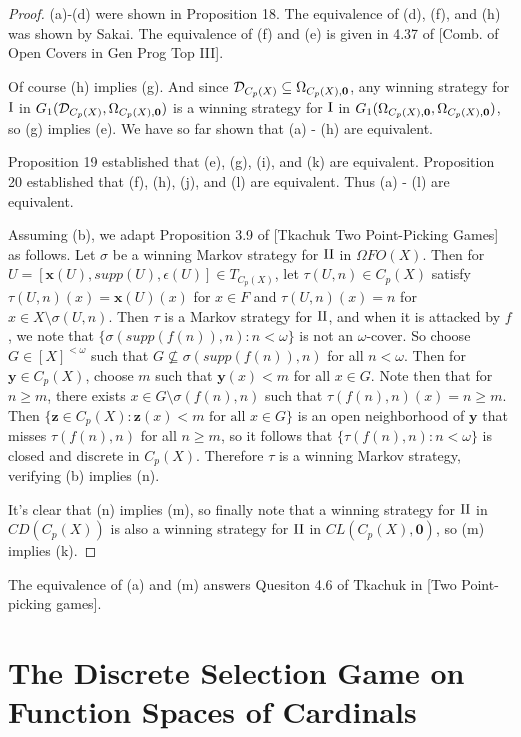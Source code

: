 \documentclass{amsart}
\theoremstyle{plain}
\theoremstyle{definition}
\theoremstyle{remark}
\theoremstyle{plain}
\theoremstyle{definition}
\theoremstyle{remark}
\begin{document}
\begin{proof}
 (a)-(d) were shown in Proposition 18.
 The equivalence of (d), (f), and (h) was shown by Sakai.
 The equivalence of (f) and (e) is given in 4.37 of [Comb. of Open Covers in Gen Prog Top III].

 Of course (h) implies (g). And since \(\mathcal{D}_{C_p(X)}\subseteq\Omega_{C_p(X),\mathbf 0}\), any winning strategy for \(\mathrm{I}\) in \(G_{1}(\mathcal{D}_{C_p(X)},\Omega_{C_p(X),\mathbf 0})\) is a winning strategy for \(\mathrm{I}\) in \(G_{1}(\Omega_{C_p(X),\mathbf 0},\Omega_{C_p(X),\mathbf 0})\), so (g) implies (e). 
 We have so far shown that (a) - (h) are equivalent.

 Proposition 19 established that (e), (g), (i), and (k) are equivalent.
 Proposition 20 established that (f), (h), (j), and (l) are equivalent.
 Thus (a) - (l) are equivalent.

 Assuming (b), we adapt Proposition 3.9 of [Tkachuk Two Point-Picking Games] as follows.
 Let \(\sigma\) be a winning Markov strategy for \(\mathrm{II}\) in \(\Omega FO(X)\). 
 Then for \(U=[\mathbf x(U),supp(U),\epsilon(U)]\in T_{C_p(X)}\), let \(\tau(U,n)\in C_p(X)\) satisfy  \(\tau(U,n)(x)=\mathbf x(U)(x)\) for \(x\in F\) and \(\tau(U,n)(x)=n\) for \(x\in X\setminus\sigma(U,n)\). 
 Then \(\tau\) is a Markov strategy for \(\mathrm{II}\), and when it is attacked by \(f\), we note that \(\{\sigma(supp(f(n)),n):n<\omega\}\) is not an \(\omega\)-cover. 
 So choose \(G\in[X]^{<\omega}\) such that \(G\not\subseteq\sigma(supp(f(n)),n)\) for all \(n<\omega\). 
 Then for \(\mathbf y\in C_p(X)\), choose \(m\) such that \(\mathbf y(x)<m\) for all \(x\in G\). 
 Note then that for \(n\geq m\), there exists \(x\in G\setminus\sigma(f(n),n)\) such that \(\tau(f(n),n)(x)=n\geq m\). 
 Then \(\{\mathbf z\in C_p(X):\mathbf z(x)<m\text{ for all }x\in G\}\) is an open neighborhood of \(\mathbf y\) that misses \(\tau(f(n),n)\) for all \(n\geq m\), so it follows that \(\{\tau(f(n),n):n<\omega\}\) is closed and discrete in \(C_p(X)\). 
 Therefore \(\tau\) is a winning Markov strategy, verifying (b) implies (n).

 It's clear that (n) implies (m), so finally note that a winning strategy for \(\mathrm{II}\) in \(CD(C_p(X))\) is also a winning strategy for \(\mathrm{II}\) in \(CL(C_p(X),\mathbf 0)\), so (m) implies (k).
\end{proof}

The equivalence of (a) and (m) answers Quesiton 4.6 of Tkachuk in [Two Point-picking games].

\section{The Discrete Selection Game on Function Spaces of Cardinals}
\end{document}

